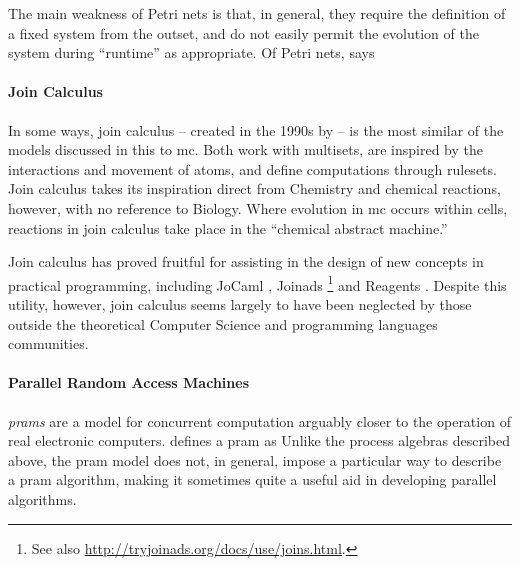 The main weakness of Petri nets is that, in general, they require the definition of a fixed system from the outset, and do not easily permit the evolution of the system during ``runtime'' as appropriate.  Of Petri nets, \citeauthor{Varela2013} says 

\paragraph{Join Calculus}
In some ways, join calculus -- created in the 1990s by \citeauthor{Fournet1996} \cite{Fournet1996,Fournet2002} -- is the most similar of the models discussed in this  to \gls{mc}.  Both work with multisets, are inspired by the interactions and movement of atoms, and define computations through rulesets.  Join calculus takes its inspiration direct from Chemistry and chemical reactions, however, with no reference to Biology.  Where evolution in \gls{mc} occurs within cells, reactions in join calculus take place in the ``chemical abstract machine.''

Join calculus has proved fruitful for assisting in the design of new concepts in practical programming, including JoCaml \cite{Fournet2003}, Joinads \cite{Petricek2011}\footnote{See also \url{http://tryjoinads.org/docs/use/joins.html}.} and Reagents \cite{Turon2012}.  Despite this utility, however, join calculus seems largely to have been neglected by those outside the theoretical Computer Science and programming languages communities.

\paragraph{\label{sec:back:pram}Parallel Random Access Machines}

\emph{\Glspl{pram}} are a model for concurrent computation arguably closer to the operation of real electronic computers.  \citeauthor{JaJa2011} defines a \gls{pram} as   Unlike the process algebras described above, the \gls{pram} model does not, in general, impose a particular way to describe a \gls{pram} algorithm, making it sometimes quite a useful aid in developing parallel algorithms.

